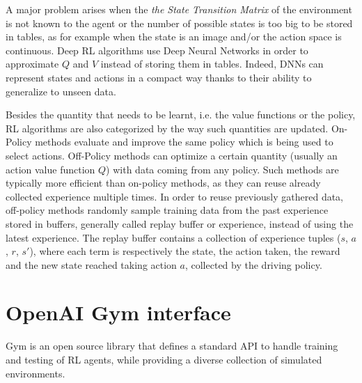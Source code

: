A major problem arises when the \textit{the State Transition Matrix} of the environment is not known to the agent or the number of possible states is too big to be stored in tables, as for example when the state is an image and/or the action space is continuous. Deep RL algorithms use Deep Neural Networks in order to approximate $Q$ and $V$ instead of storing them in tables. Indeed, DNNs can represent states and actions in a compact way thanks to their ability to generalize to unseen data. 

Besides the quantity that needs to be learnt, i.e. the value functions or the policy, RL algorithms are also categorized by the way such quantities are updated. On-Policy methods evaluate and improve the same policy which is being used to select actions. Off-Policy methods can optimize a certain quantity (usually an action value function $Q$) with data coming from any policy. Such methods are typically more efficient than on-policy methods, as they can reuse already collected experience multiple times. In order to reuse previously gathered data, off-policy methods randomly sample training data from the past experience stored in buffers, generally called replay buffer or experience, instead of using the latest experience. The replay buffer contains a collection of experience tuples ($s$, $a$, $r$, $s'$), where each term is respectively the state, the action taken, the reward and the new state reached taking action $a$, collected by the driving policy.

\section{OpenAI Gym interface}

Gym is an open source library that defines a standard API to handle training and testing of RL agents, while providing a diverse collection of simulated environments.

